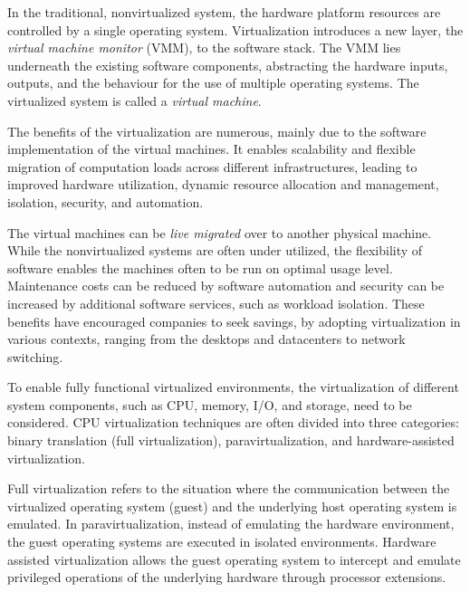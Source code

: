 In the traditional, nonvirtualized system, the hardware platform resources are controlled by a single operating system. Virtualization introduces a new layer, the \emph{virtual machine monitor} (VMM), to the software stack. The VMM lies underneath the existing software components, abstracting the hardware inputs, outputs, and the behaviour for the use of multiple operating systems. The virtualized system is called a \emph{virtual machine}.~\cite{Uhlig:2005:IVT, Bugnion:2012:BVX}

The benefits of the virtualization are numerous, mainly due to the software implementation of the virtual machines. It enables scalability and flexible migration of computation loads across different infrastructures, leading to improved hardware utilization, dynamic resource allocation and management, isolation, security, and automation.~\cite{Pearce:2013:VIS}

The virtual machines can be \emph{live migrated} over to another physical machine. While the nonvirtualized systems are often under utilized, the flexibility of software enables the machines often to be run on optimal usage level. Maintenance costs can be reduced by software automation and security can be increased by additional software services, such as workload isolation. These benefits have encouraged companies to seek savings, by adopting virtualization in various contexts, ranging from the desktops and datacenters to network switching.~\cite{Pearce:2013:VIS}

To enable fully functional virtualized environments, the virtualization of different system components, such as CPU, memory, I/O, and storage, need to be considered. CPU virtualization techniques are often divided into three categories: binary translation (full virtualization), paravirtualization, and hardware-assisted virtualization.~\cite{Bugnion:2012:BVX, Pearce:2013:VIS}


Full virtualization refers to the situation where the communication between the virtualized operating system (guest) and the underlying host operating system is emulated. In paravirtualization, instead of emulating the hardware environment, the guest operating systems are executed in isolated environments. Hardware assisted virtualization allows the guest operating system to intercept and emulate privileged operations of the underlying hardware through processor extensions.~\cite{Pearce:2013:VIS}

